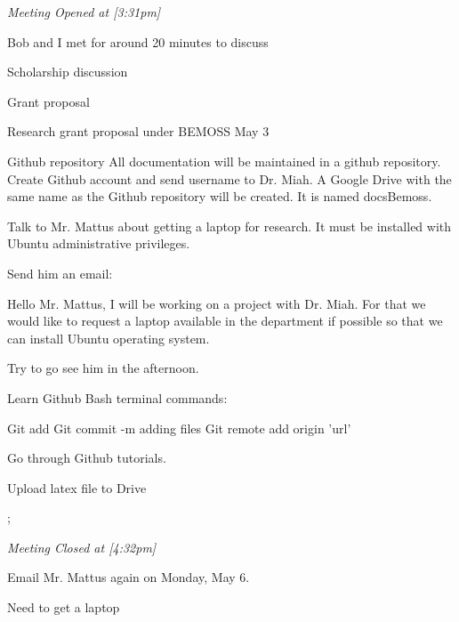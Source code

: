 \documentclass[10pt,a4paper,twoside]{mins}
\begin{document}
\begin{minutes}
\begin{center}\emph{Meeting Opened at [3:31pm]}\end{center}
\begin{business}
\item Bob and I met for around 20 minutes to discuss 

\item  Scholarship discussion



\item Grant proposal

Research grant proposal under BEMOSS May 3
\item Github repository
All documentation will be maintained in a github repository.
Create Github account and send username to Dr. Miah. A Google Drive with the same name as the Github repository will be created. 
It is named docsBemoss. 

\item
Talk to Mr. Mattus about getting a laptop for research. It must be installed with Ubuntu administrative privileges. 

Send him an email:

Hello Mr. Mattus, I will be working on a project with Dr. Miah. For that we would like to request a laptop available in the department if possible so that we can install Ubuntu operating system. 

Try to go see him in the afternoon.
\item Learn Github Bash terminal commands:

Git add
Git commit -m adding files
Git remote add origin 'url'

Go through Github tutorials.

\item Upload latex file to Drive

\end{business};
\begin{center}\emph{Meeting Closed at [4:32pm]}\end{center}
\end{minutes}
\newpage
\begin{minutes}
    \begin{business}
        \item Email Mr. Mattus again on Monday, May 6.
        \item Need to get a laptop 
        
    \end{business}
\end{minutes}
\end{document}
